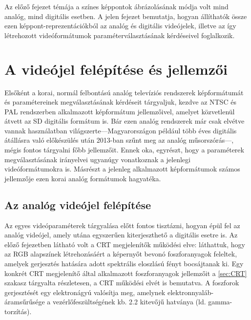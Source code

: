 Az előző fejezet témája a színes képpontok ábrázolásának módja volt mind analóg, mind digitális esetben.
A jelen fejezet bemutatja, hogyan állíthatók össze ezen képpont-reprezentációkból az analóg és digitális videójelek, illetve az így létrehozott videóformátumok paraméterválasztásának kérdéseivel foglalkozik. 

\section{A videójel felépítése és jellemzői}

Elsőként a korai, normál felbontású analóg televíziós rendszerek képformátumát és paramétereinek megválasztásának kérdéseit tárgyaljuk, kezdve az NTSC és PAL rendszerben alkalmazott képformátum jellemzőivel, amelyet közvetlenül átvett az SD digitális formátum is.
Bár ezen analóg rendszerek már csak elvétve vannak használatban világszerte---Magyarországon például több éves digitális átállásra való előkészülés után 2013-ban szűnt meg az analóg műsorszórás---, mégis fontos tárgyalni főbb jellemzőit.
Ennek oka, egyrészt, hogy a paraméterek megválasztásának irányelvei ugyanúgy vonatkoznak a jelenlegi videóformátumokra is.
Másrészt a jelenleg alkalmazott képformátumok számos jellemzője ezen korai analóg formátumok hagyatéka.

\subsection{Az analóg videójel felépítése}

Az egyes videóparaméterek tárgyalása előtt fontos tisztázni, hogyan épül fel az analóg videójel, amely utána egyszerűen kiterjeszthető a digitális esetre is.
Az előző fejezetben látható volt a CRT megjelenítők működési elve: láthattuk, hogy az RGB alapszínek létrehozásáért a képernyőt bevonó foszforanyagok feleltek, amelyek gerjesztés hatására adott spektrális eloszlású fényt bocsájtanak ki.
Egy konkrét CRT megjelenítő által alkalmazott foszforanyagok jellemzőit a \ref{sec:CRT} szakasz tárgyalta részletesen, a CRT működési elvét is bemutatva.
A foszforok gerjesztését egy elektronágyú valósítja meg, amelynek elektronnyaláb-áramsűrűsége a vezérlőfeszültségének kb. 2.2 kitevőjű hatványa (ld. gamma-torzítás).

